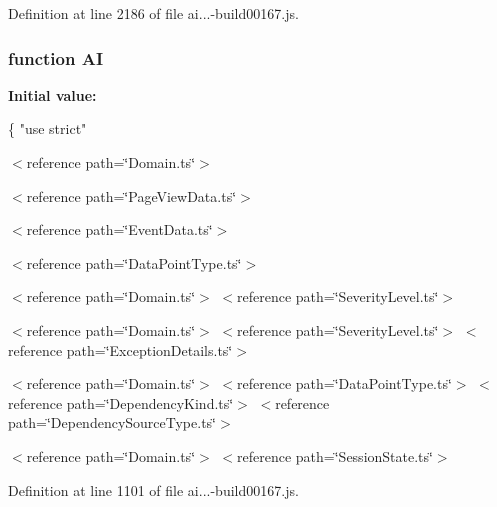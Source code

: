 Definition at line 2186 of file ai...-\/build00167.\+js.

\subsubsection[{\texorpdfstring{AI}{AI}}]{\setlength{\rightskip}{0pt plus 5cm}function AI}\hypertarget{_scripts_2ai_80_822_89-build00167_8js_a4c5b13b0856d3a81275166500e19c58b}{}\label{_scripts_2ai_80_822_89-build00167_8js_a4c5b13b0856d3a81275166500e19c58b}
{\bfseries Initial value\+:}
\begin{DoxyCode}
\{
    \textcolor{stringliteral}{"use strict"}
\end{DoxyCode}


$<$reference path=\char`\"{}\+Domain.\+ts\char`\"{}$>$ 

$<$reference path=\char`\"{}\+Page\+View\+Data.\+ts\char`\"{}$>$

$<$reference path=\char`\"{}\+Event\+Data.\+ts\char`\"{}$>$

$<$reference path=\char`\"{}\+Data\+Point\+Type.\+ts\char`\"{}$>$

$<$reference path=\char`\"{}\+Domain.\+ts\char`\"{}$>$ $<$reference path=\char`\"{}\+Severity\+Level.\+ts\char`\"{}$>$

$<$reference path=\char`\"{}\+Domain.\+ts\char`\"{}$>$ $<$reference path=\char`\"{}\+Severity\+Level.\+ts\char`\"{}$>$ $<$reference path=\char`\"{}\+Exception\+Details.\+ts\char`\"{}$>$

$<$reference path=\char`\"{}\+Domain.\+ts\char`\"{}$>$ $<$reference path=\char`\"{}\+Data\+Point\+Type.\+ts\char`\"{}$>$ $<$reference path=\char`\"{}\+Dependency\+Kind.\+ts\char`\"{}$>$ $<$reference path=\char`\"{}\+Dependency\+Source\+Type.\+ts\char`\"{}$>$

$<$reference path=\char`\"{}\+Domain.\+ts\char`\"{}$>$ $<$reference path=\char`\"{}\+Session\+State.\+ts\char`\"{}$>$ 

Definition at line 1101 of file ai...-\/build00167.\+js.

